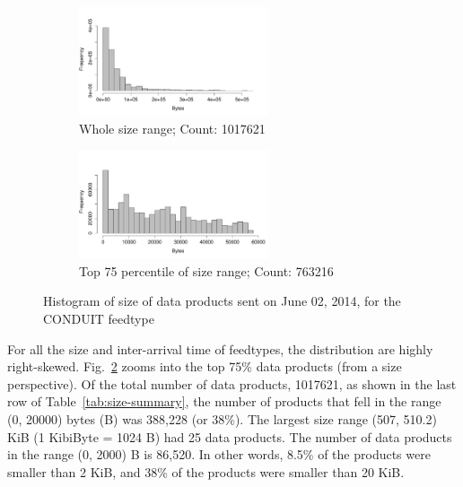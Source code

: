 \begin{figure}
\centering
    \begin{subfigure}{0.5\linewidth}
        \centering
        \includegraphics[width=2.2in]{figures/CONDUIT_20140602_Size_Hist.pdf}
        \caption{Whole size range; Count: 1017621}
        \label{CONDUIT_Size_Whole}
    \end{subfigure}\hfill
    \begin{subfigure}{0.5\linewidth}
	\centering
    \includegraphics[width=2.2in]{figures/CONDUIT_20140602_Size_75percentile.pdf}
        \caption{Top 75 percentile of size range; Count: 763216}
        \label{CONDUIT_Size_75}
    \end{subfigure}\hfill
\caption{Histogram of size of data products sent on June 02, 2014, for the CONDUIT feedtype}
    \label{CONDUIT_Size}
\end{figure}



For all the size and inter-arrival time of feedtypes, the distribution are highly right-skewed.
Fig.~\ref{CONDUIT_Size_75} zooms into the top 75\% data products (from a size perspective). Of the total number of data products, 1017621, as shown
in the last row of Table~\ref{tab:size-summary}, the number of products that fell in the range (0, 20000) bytes (B) was 388,228 (or 38\%). The largest size range (507, 510.2) KiB (1 KibiByte = 1024 B) had 25 data products.
The number of data products in the range (0, 2000) B is 86,520. In other words, 8.5\% of the products were
smaller than 2 KiB, and 38\% of the products were smaller than 20 KiB.

